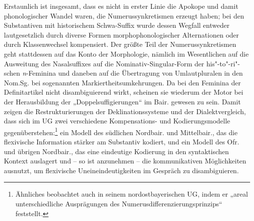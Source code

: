 Erstaunlich ist insgesamt, dass es nicht in erster Linie die Apokope und damit phonologischer Wandel waren, die Numerussynkretismen erzeugt haben; bei den Substantiven mit historischem Schwa-Suffix wurde dessen Wegfall entweder lautgesetzlich durch diverse Formen morphophonologischer Alternationen oder durch Klassenwechsel kompensiert. Der größte Teil der Numerussynkretismen geht stattdessen auf das Konto der Morphologie, nämlich im Wesentlichen auf die Ausweitung des Nasalsuffixes auf die Nominativ-Singular-Form der his"-to"-ri"-schen \textit{n}{}-Feminina und daneben auf die Übertragung von Umlautpluralen in den Nom.Sg. bei sogenannten Markiertheitsumkehrungen. Da bei den Feminina der Definitartikel nicht disambiguierend wirkt, scheinen sie wiederum der Motor bei der Herausbildung der „Doppelsuffigierungen“ im Bair. gewesen zu sein. Damit zeigen die Restrukturierungen der Deklinationssysteme und der Dialektvergleich, dass sich im UG zwei verschiedene Kompensations- und Kodierungsmodelle gegenüberstehen:\footnote{Ähnliches beobachtet auch \citet[200]{Rowley1997} in seinem nordostbayerischen UG, indem er „areal unterschiedliche Ausprägungen des Numerusdifferenzierungsprinzips“ feststellt.} ein Modell des südlichen Nordbair. und Mittelbair., das die flexivische Information stärker am Substantiv kodiert, und ein Modell des Ofr. und übrigen Nordbair., das eine eindeutige Kodierung in den syntaktischen Kontext auslagert und -- so ist anzunehmen -- die kommunikativen Möglichkeiten ausnutzt, um flexivische Uneineindeutigkeiten im Gespräch zu disambiguieren.
